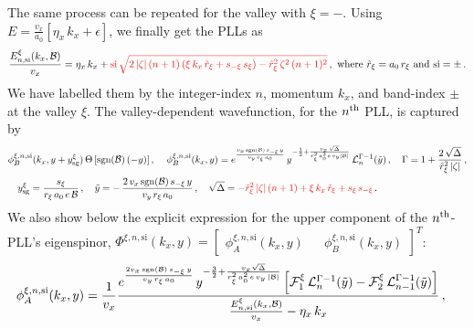 \documentclass[aps,prb, onecolumn, nofootinbib, citeautoscript,10pt]{revtex4-2}
\newcommand{\red}[1]{{\color{red}#1}}
\def \nn{\nonumber \\}
\begin{document}
\begin{widetext}
The same process can be repeated for the valley with $\xi =- $. Using $E= \frac{v_x} {a_0} \left[  \eta_x \,   k_x + \epsilon   \right ]$, we finally get the PLLs as
\begin{align}
\frac{  E^{\xi}_{n, \rm{si}} (k_x, \mathcal B) } {v_x} =  
\eta_x \,   k_x + \red{\text{si} \,\sqrt{ 2\,|\zeta|\,(n+1) \left (\xi\,k_x \, \tilde r_\xi + s_{-\xi} \, s_\xi \right ) - \tilde r_\xi^2 \, \zeta^2\,(n+1)^2 }}  \,,
\text{ where } \tilde{r}_\xi = a_0 \, r_\xi \text{ and } \text{si} =\pm\,.
\end{align}
We have labelled them by the integer-index $n$, momentum $k_x$, and band-index $\pm$ at the valley $\xi$. The valley-dependent wavefunction, for the $n^{\rm th}$ PLL, is captured by
\begin{align}
& \phi_B^{\xi,n, \text{si}} (k_x, y+ y^\xi_{\rm sg}) \, \Theta \left[ \text{sgn}(\mathcal B ) \left(- y\right)  \right],\,
\quad
 \phi_B^{\xi, n, \text{si}} (k_x, y) = e^{\frac{ v_x \, \text{sgn} (\mathcal B) \,s_{- \xi}\, y} { v_y \, r_\xi\, a_0 }} \, 
y^{-\frac{1}{2}+{\frac{ v_x \,\sqrt{\Delta}}{ r_\xi^2\, a_0^2\, e  \, v_y  \left |{\mathcal B}  \right |}}} \, 
{\mathcal L}^{\Gamma-1}_{n}(\tilde y)\,, 
\quad  \Gamma = 1+ \frac{2 \,\sqrt{\Delta }}{\tilde  r_\xi^2 \, |\zeta|} \,,\nn
& \quad  y^\xi_{\rm sg} = \frac{s_\xi } {r_\xi \,a_0\,  e\, {\mathcal B}}\,,\quad
\tilde y = -\, \frac{ 2\, v_x \, \text{sgn} (\mathcal B) \,s_{-\xi}\, y} 
{ v_y \,r_\xi \, a_0 }\,, \quad
\sqrt{\Delta}=\red{-{\tilde r}_\xi^2 \, |\zeta |\, (n+1) + \xi\,k_x \, {\tilde r}_\xi + s_{\xi} \, s_{-\xi}} \,.
\end{align}
We also show below the explicit expression for the upper component of the $n^{\rm th}$-PLL's eigenspinor, $ \Phi^{\xi, n, \text{si}} (k_x, y) = \begin{bmatrix}
\phi_A^{\xi, n, \text{si}}  (k_x, y) && \phi_B^{\xi, n, \text{si}}  (k_x, y)  \end{bmatrix}^T $:
\begin{align}
\label{eqphia}
& \phi_A^{\xi, n, \text{si}} (k_x, y)  =  \frac{1}{v_x} \frac{
e^{\frac{2v_x \,\mathrm{sgn}(\mathcal{B})\, s_{-\xi}\, y}{v_y\, r_\xi\, a_0}}
\, y^{-\frac{3}{2} + 
\frac{v_x \sqrt{\Delta}}{r_{\xi}^2\, a_0^2\, e\, v_y\, \left|\mathcal{B}\right|}}
\left[
{\mathcal{F}}_1^\xi\,\mathcal{L}_{n}^{\Gamma-1}(\tilde{y})
-
{\mathcal{F}}_2^\xi \,\mathcal{L}_{n-1}^{\Gamma-1}(\tilde{y})\right]}
{ \frac{ E^{\xi}_{n, \rm{si}} (k_x, \mathcal B)} {v_x} - \eta_x \,   k_x }\,,

\end{align}
\end{widetext}
\end{document}
